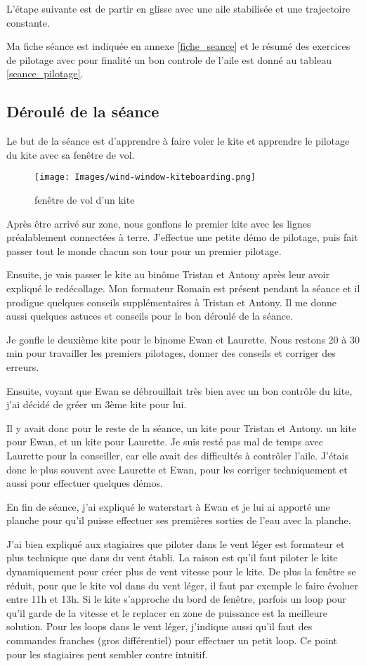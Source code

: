 \documentclass[11pt,a4paper]{report}
\begin{document}
L'étape suivante est de partir en glisse avec
une aile stabilisée et une trajectoire constante.

Ma fiche séance est indiquée en annexe \ref{fiche_seance}
et le résumé des exercices de pilotage avec pour
finalité un bon controle de l'aile est donné
au tableau \ref{seance_pilotage}.

\subsection{Déroulé de la séance}
Le but de la séance est d'apprendre à faire voler le kite et
apprendre le pilotage du kite avec sa fen\^etre de vol.
\begin{figure}
\centering
\texttt{[image: Images/wind-window-kiteboarding.png]}
\caption{fen\^etre de vol d'un kite\label{fenetre}}
\end{figure} 

Après \^etre arrivé sur zone, nous gonflons le premier kite avec les
lignes préalablement connectées à terre. J'effectue une petite démo
de pilotage, puis fait passer tout le monde chacun son tour pour
un premier pilotage.

Ensuite, je vais passer le kite au binôme Tristan et Antony après leur
avoir expliqué le redécollage. Mon formateur Romain est présent pendant la
séance et il prodigue quelques conseils supplémentaires à Tristan et Antony.
Il me donne aussi quelques astuces et conseils pour le bon déroulé de la séance.

Je gonfle le deuxième kite pour le binome Ewan et Laurette.
Nous restons 20 à 30 min pour travailler les premiers pilotages,
donner des conseils et corriger des erreurs.

Ensuite, voyant que Ewan se débrouillait très bien avec un bon contrôle du 
kite, j'ai décidé de gréer un 3ème kite pour lui.

Il y avait donc pour le reste de la séance, un kite pour Tristan et Antony.
un kite pour Ewan, et un kite pour Laurette. Je suis resté pas mal de temps
avec Laurette pour la conseiller, car elle avait des difficultés à contrôler l'aile.
J'étais donc le plus souvent avec Laurette et Ewan, pour les corriger techniquement 
et aussi pour effectuer quelques démos.

En fin de séance, j'ai expliqué le waterstart à Ewan et je lui ai
apporté une planche pour qu'il puisse effectuer ses premières sorties
de l'eau avec la planche.

J'ai bien expliqué aux stagiaires que piloter dans le vent léger est
formateur et plus technique que dans du vent établi. La raison est qu'il faut
piloter le kite dynamiquement pour créer plus de vent vitesse pour le kite.
De plus la fen\^etre se réduit, pour que le kite vol dans du vent léger, 
il faut par exemple le faire évoluer entre 11h et 13h. Si le kite s'approche du 
bord de fen\^etre, parfois un loop pour qu'il garde de la vitesse et le replacer
en zone de puissance est la meilleure solution.
Pour les loops dans le vent léger, j'indique aussi qu'il faut
des commandes franches (gros différentiel) pour effectuer un petit loop.
Ce point pour les stagiaires peut sembler contre intuitif.
\end{document}
